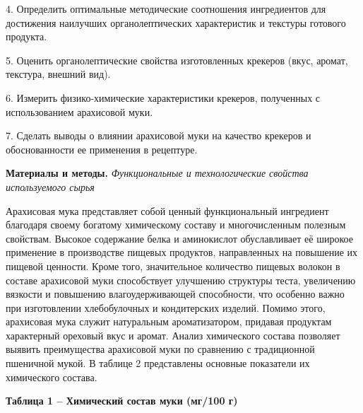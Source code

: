 {{{4. Определить оптимальные методические соотношения ингредиентов для
достижения наилучших органолептических характеристик и текстуры готового
продукта.

5. Оценить органолептические свойства изготовленных крекеров (вкус,
аромат, текстура, внешний вид).

6. Измерить физико-химические характеристики крекеров, полученных с
использованием арахисовой муки.

7. Сделать выводы о влиянии арахисовой муки на качество крекеров и
обоснованности ее применения в рецептуре.

{\bfseries Материалы и методы.} \emph{Функциональные и технологические
свойства используемого сырья}

Арахисовая мука представляет собой ценный функциональный ингредиент
благодаря своему богатому химическому составу и многочисленным полезным
свойствам. Высокое содержание белка и аминокислот обуславливает её
широкое применение в производстве пищевых продуктов, направленных на
повышение их пищевой ценности. Кроме того, значительное количество
пищевых волокон в составе арахисовой муки способствует улучшению
структуры теста, увеличению вязкости и повышению влагоудерживающей
способности, что особенно важно при изготовлении хлебобулочных и
кондитерских изделий. Помимо этого, арахисовая мука служит натуральным
ароматизатором, придавая продуктам характерный ореховый вкус и аромат.
Анализ химического состава позволяет выявить преимущества арахисовой
муки по сравнению с традиционной пшеничной мукой. В таблице 2
представлены основные показатели их химического состава.

{\bfseries Таблица 1 -- Химический состав муки (мг/100 г)}

}}}
